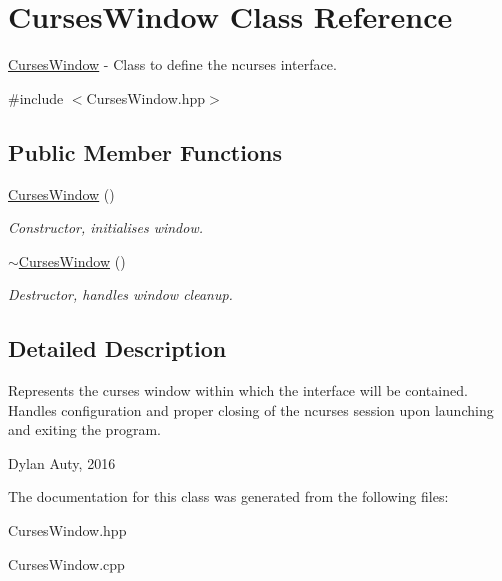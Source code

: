 \hypertarget{classCursesWindow}{}\section{Curses\+Window Class Reference}
\label{classCursesWindow}


\hyperlink{classCursesWindow}{Curses\+Window} -\/ Class to define the ncurses interface.  




{\ttfamily \#include $<$Curses\+Window.\+hpp$>$}

\subsection*{Public Member Functions}
\begin{DoxyCompactItemize}
\item 
\hypertarget{classCursesWindow_a088b31a5f3558ead6997a949f092ebbf}{}\label{classCursesWindow_a088b31a5f3558ead6997a949f092ebbf} 
\hyperlink{classCursesWindow_a088b31a5f3558ead6997a949f092ebbf}{Curses\+Window} ()
\begin{DoxyCompactList}\small\item\em Constructor, initialises window. \end{DoxyCompactList}\item 
\hypertarget{classCursesWindow_abd721c8e7b4cfc5da1e87123fd3b2601}{}\label{classCursesWindow_abd721c8e7b4cfc5da1e87123fd3b2601} 
\hyperlink{classCursesWindow_abd721c8e7b4cfc5da1e87123fd3b2601}{$\sim$\+Curses\+Window} ()
\begin{DoxyCompactList}\small\item\em Destructor, handles window cleanup. \end{DoxyCompactList}\end{DoxyCompactItemize}


\subsection{Detailed Description}
Represents the curses window within which the interface will be contained. Handles configuration and proper closing of the ncurses session upon launching and exiting the program.

Dylan Auty, 2016 

The documentation for this class was generated from the following files\+:\begin{DoxyCompactItemize}
\item 
Curses\+Window.\+hpp\item 
Curses\+Window.\+cpp\end{DoxyCompactItemize}
